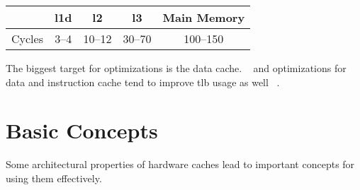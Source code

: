\documentclass[a4paper]{scrartcl}
\begin{document}
\begin{center}
   \begin{tabular}{ r | c c c c }
             & \gls{l1d} & \gls{l2} & \gls{l3} & Main Memory \\ \hline
      Cycles & 3--4      & 10--12   & 30--70   & 100--150
   \end{tabular}
\end{center}
%

The biggest target for optimizations is the data cache.  ~\cite[31]{drepper2007} and optimizations for data and instruction cache
tend to improve \gls{tlb} usage as well%
~\cite[\href{https://youtu.be/WDIkqP4JbkE?t=11m53s}{11:53}]{scott-meyers-talk}.

\section{Basic Concepts}
Some architectural properties of hardware caches lead to important concepts for using them
effectively.
\end{document}
